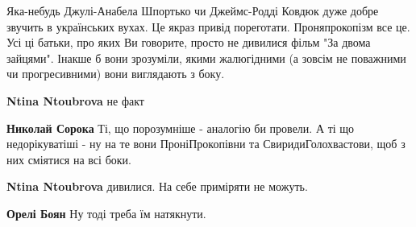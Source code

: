 \begin{itemize}
 

Яка-небудь Джулі-Анабела Шпортько чи Джеймс-Родді Ковдюк дуже добре звучить в
українських вухах. \Smiley[1.0][yellow] Це якраз привід пореготати. Проняпрокопізм все це. Усі ці
батьки, про яких Ви говорите, просто не дивилися фільм "За двома зайцями".
Інакше б вони зрозуміли, якими жалюгідними (а зовсім не поважними чи
прогресивними) вони виглядають з боку. \Smiley[1.0][yellow]

\begin{itemize}
 
\textbf{Ntina Ntoubrova} не факт

 
\textbf{Николай Сорока} Ті, що порозумніше - аналогію би провели. А ті що
недорікуватіші - ну на те вони ПроніПрокопівни та СвиридиГолохвастови, щоб з
них сміятися на всі боки. \Laughey[1.0][white]

 
\textbf{Ntina Ntoubrova} дивилися. На себе приміряти не можуть.

 
\textbf{Орелі Боян} Ну тоді треба їм натякнути.

 

\end{itemize}
\end{itemize}
